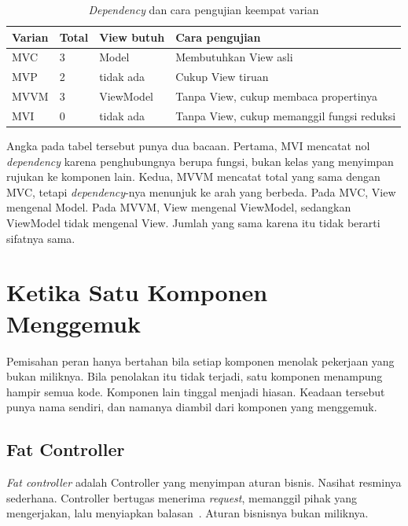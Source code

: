 \begin{table}[htbp]
  \centering
  \caption{\textit{Dependency} dan cara pengujian keempat varian}
  \label{tab:dependency-mv}
  \begin{tabularx}{\textwidth}{|l|l|l|X|}
    \hline
    \textbf{Varian} & \textbf{Total} & \textbf{View butuh} & \textbf{Cara pengujian} \\
    \hline
    MVC & 3 & Model & Membutuhkan View asli \\
    \hline
    MVP & 2 & tidak ada & Cukup View tiruan \\
    \hline
    MVVM & 3 & ViewModel & Tanpa View, cukup membaca propertinya \\
    \hline
    MVI & 0 & tidak ada & Tanpa View, cukup memanggil fungsi reduksi \\
    \hline
  \end{tabularx}
\end{table}

Angka pada tabel tersebut punya dua bacaan. Pertama, MVI mencatat nol
\textit{dependency} karena penghubungnya berupa fungsi, bukan kelas yang menyimpan
rujukan ke komponen lain. Kedua, MVVM mencatat total yang sama dengan MVC,
tetapi \textit{dependency}-nya menunjuk ke arah yang berbeda. Pada MVC, View mengenal
Model. Pada MVVM, View mengenal ViewModel, sedangkan ViewModel tidak mengenal
View. Jumlah yang sama karena itu tidak berarti sifatnya sama.

\section{Ketika Satu Komponen Menggemuk}

Pemisahan peran hanya bertahan bila setiap komponen menolak pekerjaan yang bukan
miliknya. Bila penolakan itu tidak terjadi, satu komponen menampung hampir semua
kode. Komponen lain tinggal menjadi hiasan. Keadaan tersebut punya nama sendiri,
dan namanya diambil dari komponen yang menggemuk.

\subsection{Fat Controller}

\textit{Fat controller} adalah Controller
yang menyimpan aturan bisnis. Nasihat
resminya sederhana. Controller bertugas menerima \textit{request}, memanggil pihak
yang mengerjakan, lalu menyiapkan balasan~\cite{rails2026controller}. Aturan
bisnisnya bukan miliknya.

